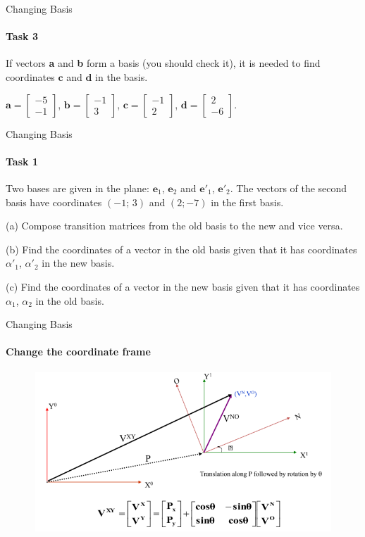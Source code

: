 \documentclass[aspectratio=169,notes]{beamer}
\begin{document}
\begin{frame}[t]{Changing Basis}
    \framesubtitle{Task 3}
    If vectors \textbf{a} and \textbf{b} form a basis (you should check it), it is needed to find coordinates $\textbf{c}$ and $\textbf{d}$ in the basis.\medskip

    $\textbf{a}=\begin{bmatrix} -5 \\ -1 \end{bmatrix}$, $\textbf{b}=\begin{bmatrix} -1 \\ 3\end{bmatrix}$,
    $\textbf{c}=\begin{bmatrix} -1 \\ 2 \end{bmatrix}$,
    $\textbf{d}=\begin{bmatrix} 2 \\ -6\end{bmatrix}$.
\end{frame}

\begin{frame}[t]{Changing Basis}
    \framesubtitle{Task 1}
    Two bases are given in the plane: $\textbf{e}_1$, $\textbf{e}_2$ and $\textbf{e}'_1$, $\textbf{e}'_2$. The vectors of the second basis have coordinates $(-1;\,3)$ and $(2;-7)$ in the first basis.

    (a) Compose transition matrices from the old basis to the new and vice versa.

    (b) Find the coordinates of a vector in the old basis given that it has coordinates $\alpha'_1$, $\alpha'_2$ in the new basis.

    (c) Find the coordinates of a vector in the new basis given that it has coordinates $\alpha_1$, $\alpha_2$ in the old basis.
\end{frame}

\begin{frame}[t]{Changing Basis}
    \framesubtitle{Change the coordinate frame}
    \vspace{-0.6cm}
    \begin{figure}[H]
        \centering\includegraphics[height=6cm,width=1\textwidth,keepaspectratio]{change_klimchik_1.png}
        \label{fig:change_klimchik_1.png}
    \end{figure}
\end{frame}
\end{document}
